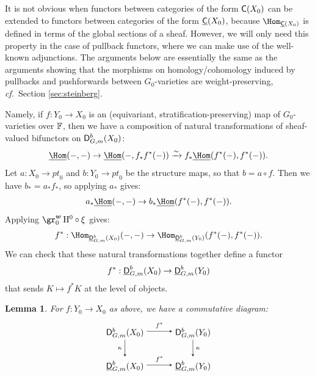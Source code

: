\documentclass[a4paper,10pt,leqno]{amsart}
\theoremstyle{plain}
\theoremstyle{plain}
\theoremstyle{plain}
\newtheorem{lem}[thm]{Lemma}
\theoremstyle{definition}
\theoremstyle{remark}
\newcommand{\point}{\mathit{pt}}
\begin{document}
\subsection{}

It is not obvious when functors between categories of the form $\sf{C}(X_0)$ can be extended to functors between categories of the form $\underline{\sf{C}}(X_0)$, because $\Hom_{\underline{\sf{C}}(X_0)}$ is defined in terms of the global sections of a sheaf.
However, we will only need this property in the case of pullback functors, where we can make use of the well-known adjunctions.
The arguments below are essentially the same as the arguments showing that the morphisms on homology/cohomology induced by pullbacks and pushforwards between $G_0$-varieties are weight-preserving, \emph{cf.}\ Section \ref{sec:steinberg}.

Namely, if $f : Y_0 \to X_0$ is an (equivariant, stratification-preserving) map of $G_0$-varieties over $\bb{F}$, then we have a composition of natural transformations of sheaf-valued bifunctors on $\sf{D}_{G, m}^b(X_0)$:
\begin{align}
\SHom(-, -) \to \SHom(-, f_\ast f^\ast(-)) \xrightarrow{\sim} f_\ast \SHom(f^\ast(-), f^\ast(-)).
\end{align}
Let $a : X_0 \to \point_0$ and $b : Y_0 \to \point_0$ be the structure maps, so that $b = a \circ f$.
Then we have $b_\ast = a_\ast f_\ast$, so applying $a_\ast$ gives:
\begin{align}\label{eq:a-to-b}
a_\ast \SHom(-, -) \to b_\ast \SHom(f^\ast(-), f^\ast(-)).
\end{align}
Applying $\gr_0^{\bm{w}}\,\ur{H}^0 \circ \xi$ gives:
\begin{align}
f^\ast : \Hom_{\underline{\sf{D}}_{G, m}^b(X_0)}(-, -) \to \Hom_{\underline{\sf{D}}_{G, m}^b(Y_0)}(f^\ast(-), f^\ast(-)).
\end{align}
We can check that these natural transformations together define a functor 
\begin{align}\label{eq:pullback}
f^\ast : \underline{\sf{D}}_{G, m}^b(X_0) \to \underline{\sf{D}}_{G, m}^b(Y_0)
\end{align}
that sends $K \mapsto f^\ast K$ at the level of objects.

\begin{lem}\label{lem:pullback}
For $f : Y_0 \to X_0$ as above, we have a commutative diagram:
\begin{equation}
\begin{tikzpicture}[baseline=(current bounding box.center), >=stealth]
\matrix(m)[matrix of math nodes, row sep=2em, column sep=3em, text height=2.5ex, text depth=0.5ex]
{	\sf{D}_{G, m}^b(X_0)
		&\sf{D}_{G, m}^b(Y_0)\\
	\underline{\sf{D}}_{G, m}^b(X_0)
		&\underline{\sf{D}}_{G, m}^b(Y_0)\\
		};
\path[->,font=\scriptsize, auto]
(m-1-1)		edge node{$f^\ast$} (m-1-2)
(m-1-1)		edge node[left]{$\kappa$} (m-2-1)
(m-1-2)		edge node{$\kappa$} (m-2-2)
(m-2-1)		edge node{$f^\ast$} (m-2-2);
\end{tikzpicture}
\end{equation}
\end{lem}
\end{document}
